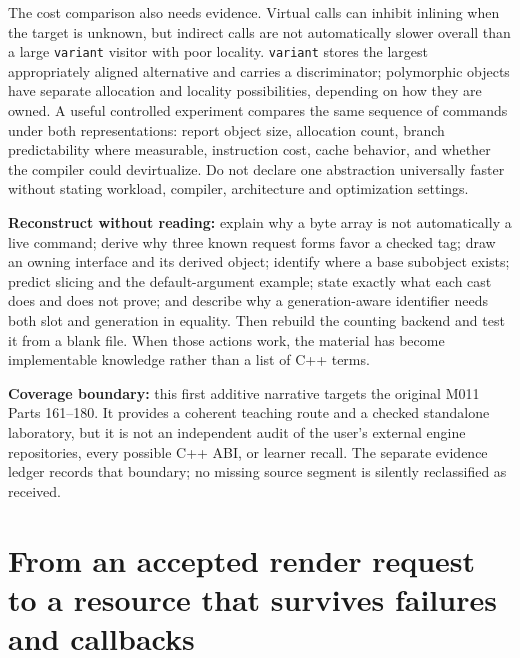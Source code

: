 The cost comparison also needs evidence. Virtual calls can inhibit inlining when the target is unknown, but indirect calls are not automatically slower overall than a large \texttt{variant} visitor with poor locality. \texttt{variant} stores the largest appropriately aligned alternative and carries a discriminator; polymorphic objects have separate allocation and locality possibilities, depending on how they are owned. A useful controlled experiment compares the same sequence of commands under both representations: report object size, allocation count, branch predictability where measurable, instruction cost, cache behavior, and whether the compiler could devirtualize. Do not declare one abstraction universally faster without stating workload, compiler, architecture and optimization settings.

\textbf{Reconstruct without reading:} explain why a byte array is not automatically a live command; derive why three known request forms favor a checked tag; draw an owning interface and its derived object; identify where a base subobject exists; predict slicing and the default-argument example; state exactly what each cast does and does not prove; and describe why a generation-aware identifier needs both slot and generation in equality. Then rebuild the counting backend and test it from a blank file. When those actions work, the material has become implementable knowledge rather than a list of C++ terms.

\textbf{Coverage boundary:} this first additive narrative targets the original M011 Parts 161--180. It provides a coherent teaching route and a checked standalone laboratory, but it is not an independent audit of the user's external engine repositories, every possible C++ ABI, or learner recall. The separate evidence ledger records that boundary; no missing source segment is silently reclassified as received.

\section{From an accepted render request to a resource that survives failures and callbacks}\label{05-engine-i-ch004-from-an-accepted-render-request-to-a-resource-that-survives-failures-and-callbacks}

\hypertarget{05-engine-i-ch004-from-an-accepted-render-request-to-a-resource-that-survives-failures-and-callbacks}{}

